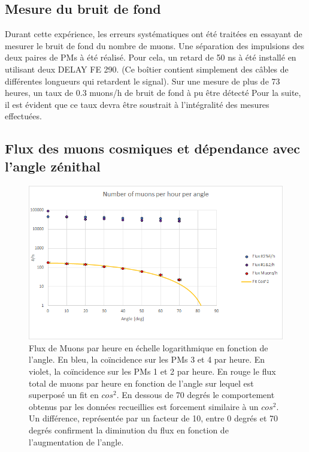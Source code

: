\documentclass[12pt]{article}
\begin{document}
\subsection{Mesure du bruit de fond}

Durant cette expérience, les erreurs systématiques ont été traitées en essayant de mesurer le bruit de fond du nombre de muons. 
Une séparation des impulsions des deux paires de PMs à été réalisé. Pour cela, un retard de 50 ns  à été installé en utilisant deux DELAY FE 290. (Ce boîtier contient simplement des câbles de différentes longueurs qui retardent le signal). Sur une mesure de plus de 73 heures, un taux de 0.3 muons/h de bruit de fond à pu être détecté Pour la suite, il est évident que ce taux devra être soustrait à l'intégralité des mesures effectuées.


\subsection{Flux des muons cosmiques et dépendance avec l'angle zénithal}

\begin{figure}[!htbp]
    \centering
    \includegraphics[width=\textwidth]{graphiques/experience2/NumberMuonsPerHourPerAngle.png}
    \caption{Flux de Muons par heure en échelle logarithmique en fonction de l'angle. En bleu, la coïncidence sur les PMs 3 et 4 par heure. En violet, la coïncidence sur les PMs 1 et 2 par heure. En rouge le flux total de muons par heure en fonction de l'angle sur lequel est superposé un fit en $cos^2$. En dessous de 70 degrés le comportement obtenus par les données recueillies est forcement similaire à un $cos^2$. Un différence, représentée par un facteur de 10, entre 0 degrés et 70 degrés confirment la diminution du flux en fonction de l'augmentation de l'angle.}
    \label{fig:NumberMuonsPerHourPerAngle}
\end{figure}
\end{document}
